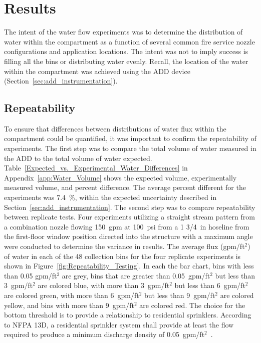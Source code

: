 \documentclass[12pt,oneside]{book}
\begin{document}
\chapter{Results}

The intent of the water flow experiments was to determine the distribution of water within the compartment as a function of several common fire service nozzle configurations and application locations. The intent was not to imply success is filling all the bins or distributing water evenly.  Recall, the location of the water within the compartment was achieved using the ADD device (Section~\ref{sec:add_instrumentation}). 

\section{Repeatability}
\label{sec:repeat}
To ensure that differences between distributions of water flux within the compartment could be quantified, it was important to confirm the repeatability of experiments. The first step was to compare the total volume of water measured in the ADD to the total volume of water expected. Table~\ref{Expected_vs._Experimental_Water_Differences} in Appendix~\ref{app:Water_Volume} shows the expected volume, experimentally measured volume, and percent difference. The average percent different for the experiments was 7.4~\%, within the expected uncertainty described in Section~\ref{sec:add_instrumentation}. The second step was to compare repeatability between replicate tests. Four experiments utilizing a straight stream pattern from a combination nozzle flowing 150~gpm at 100~psi from a 1 3/4~in hoseline from the first-floor window position directed into the structure with a maximum angle were conducted to determine the variance in results. The average flux (gpm/ft$^2$) of water in each of the 48 collection bins for the four replicate experiments is shown in Figure~\ref{fig:Repeatability_Testing}. In each the bar chart, bins with less than 0.05 gpm/ft$^2$ are grey, bins that are greater than 0.05~gpm/ft$^2$ but less than 3~gpm/ft$^2$ are colored blue, with more than 3~gpm/ft$^2$ but less than 6~gpm/ft$^2$ are colored green, with more than 6~gpm/ft$^2$ but less than 9~gpm/ft$^2$ are colored yellow, and bins with more than 9~gpm/ft$^2$ are colored red. The choice for the bottom threshold is to provide a relationship to residential sprinklers. According to NFPA 13D, a residential sprinkler system shall provide at least the flow required to produce a minimum discharge density of 0.05~gpm/ft$^2$~\cite{NFPA_13D}.
\end{document}
